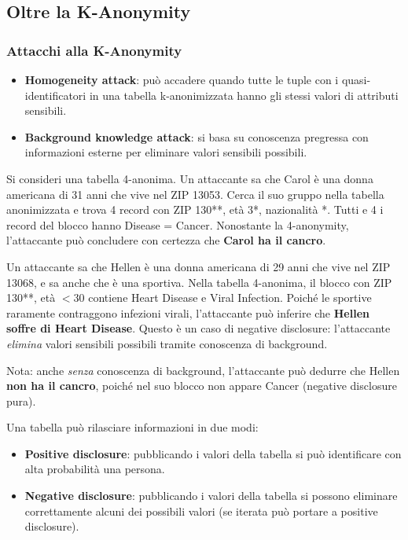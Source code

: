 \documentclass[a4paper,11pt]{article}
\begin{document}
\subsection{Oltre la K-Anonymity}

\subsubsection{Attacchi alla K-Anonymity}

\begin{itemize}
  \item \textbf{Homogeneity attack}: pu\`{o} accadere quando tutte le tuple con i quasi-identificatori in una tabella k-anonimizzata hanno gli stessi valori di attributi sensibili.
  \item \textbf{Background knowledge attack}: si basa su conoscenza pregressa con informazioni esterne per eliminare valori sensibili possibili.
\end{itemize}

\begin{esempio}
Si consideri una tabella 4-anonima. Un attaccante sa che Carol \`{e} una donna americana di 31 anni che vive nel ZIP 13053. Cerca il suo gruppo nella tabella anonimizzata e trova 4 record con ZIP 130**, et\`{a} 3*, nazionalit\`{a} *. Tutti e 4 i record del blocco hanno Disease = Cancer. Nonostante la 4-anonymity, l'attaccante pu\`{o} concludere con certezza che \textbf{Carol ha il cancro}.
\end{esempio}

\begin{esempio}
Un attaccante sa che Hellen \`{e} una donna americana di 29 anni che vive nel ZIP 13068, e sa anche che \`{e} una sportiva. Nella tabella 4-anonima, il blocco con ZIP 130**, et\`{a} $<$30 contiene Heart Disease e Viral Infection. Poich\'{e} le sportive raramente contraggono infezioni virali, l'attaccante pu\`{o} inferire che \textbf{Hellen soffre di Heart Disease}. Questo \`{e} un caso di negative disclosure: l'attaccante \emph{elimina} valori sensibili possibili tramite conoscenza di background.

Nota: anche \emph{senza} conoscenza di background, l'attaccante pu\`{o} dedurre che Hellen \textbf{non ha il cancro}, poich\'{e} nel suo blocco non appare Cancer (negative disclosure pura).
\end{esempio}

Una tabella pu\`{o} rilasciare informazioni in due modi:
\begin{itemize}
  \item \textbf{Positive disclosure}: pubblicando i valori della tabella si pu\`{o} identificare con alta probabilit\`{a} una persona.
  \item \textbf{Negative disclosure}: pubblicando i valori della tabella si possono eliminare correttamente alcuni dei possibili valori (se iterata pu\`{o} portare a positive disclosure).
\end{itemize}
\end{document}
